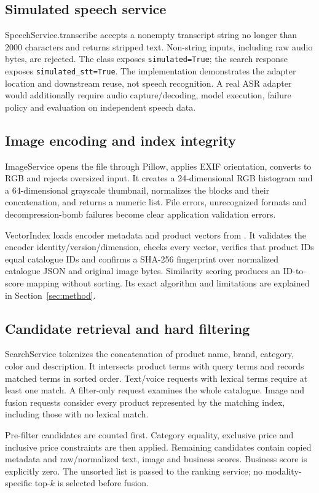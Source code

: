 \documentclass[11pt,a4paper]{article}
\begin{document}
\subsection{Simulated speech service}
SpeechService.transcribe accepts a nonempty transcript string no longer than 2000 characters and returns stripped text. Non-string inputs, including raw audio bytes, are rejected. The class exposes \texttt{simulated=True}; the search response exposes \texttt{simulated\_stt=True}. The implementation demonstrates the adapter location and downstream reuse, not speech recognition. A real ASR adapter would additionally require audio capture/decoding, model execution, failure policy and evaluation on independent speech data.

\subsection{Image encoding and index integrity}
ImageService opens the file through Pillow, applies EXIF orientation, converts to RGB and rejects oversized input. It creates a 24-dimensional RGB histogram and a 64-dimensional grayscale thumbnail, normalizes the blocks and their concatenation, and returns a numeric list. File errors, unrecognized formats and decompression-bomb failures become clear application validation errors.

VectorIndex loads encoder metadata and product vectors from . It validates the encoder identity/version/dimension, checks every vector, verifies that product IDs equal catalogue IDs and confirms a SHA-256 fingerprint over normalized catalogue JSON and original image bytes. Similarity scoring produces an ID-to-score mapping without sorting. Its exact algorithm and limitations are explained in Section~\ref{sec:method}.

\subsection{Candidate retrieval and hard filtering}
SearchService tokenizes the concatenation of product name, brand, category, color and description. It intersects product terms with query terms and records matched terms in sorted order. Text/voice requests with lexical terms require at least one match. A filter-only request examines the whole catalogue. Image and fusion requests consider every product represented by the matching index, including those with no lexical match.

Pre-filter candidates are counted first. Category equality, exclusive price and inclusive price constraints are then applied. Remaining candidates contain copied metadata and raw/normalized text, image and business scores. Business score is explicitly zero. The unsorted list is passed to the ranking service; no modality-specific top-$k$ is selected before fusion.
\end{document}
